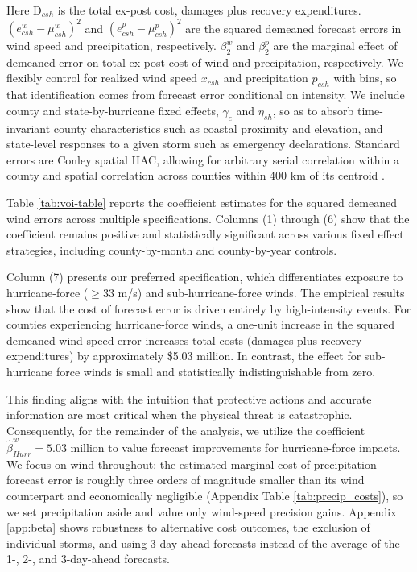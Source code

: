 \documentclass[12pt]{article}%
\begin{document}
Here $\text{D}_{csh}$ is the total ex-post cost, damages plus recovery expenditures. $\left(e^w_{csh}-\mu^w_{csh}\right)^2$ and $\left(e^p_{csh}-\mu^p_{csh}\right)^2$ are the squared demeaned forecast errors in wind speed and precipitation, respectively. $\beta^{w}_{2}$ and $\beta^{p}_{2}$ are the marginal effect of demeaned error on total ex-post cost of wind and precipitation, respectively. We flexibly control for realized wind speed $x_{csh}$ and precipitation $p_{csh}$ with bins, so that identification comes from forecast error conditional on intensity. We include county and state-by-hurricane fixed effects, $\gamma_{c}$ and $\eta_{sh}$, so as to absorb time-invariant county characteristics such as coastal proximity and elevation, and state-level responses to a given storm such as emergency declarations. Standard errors are Conley spatial HAC, allowing for arbitrary serial correlation within a county and spatial correlation across counties within 400 km of its centroid \citep{Conley1999}.

Table \ref{tab:voi-table} reports the coefficient estimates for the squared demeaned wind errors across multiple specifications. Columns (1) through (6) show that the coefficient remains positive and statistically significant across various fixed effect strategies, including county-by-month and county-by-year controls.



Column (7) presents our preferred specification, which differentiates exposure to hurricane-force ($\geq33$ m/s) and sub-hurricane-force winds. The empirical results show that the cost of forecast error is driven entirely by high-intensity events. For counties experiencing hurricane-force winds, a one-unit increase in the squared demeaned wind speed error increases total costs (damages plus recovery expenditures) by approximately \$5.03 million. In contrast, the effect for sub-hurricane force winds is small and statistically indistinguishable from zero.

This finding aligns with the intuition that protective actions and accurate information are most critical when the physical threat is catastrophic. Consequently, for the remainder of the analysis, we utilize the coefficient $\hat{\beta}^w_{Hurr} = 5.03$ million to value forecast improvements for hurricane-force impacts. We focus on wind throughout: the estimated marginal cost of precipitation forecast error is roughly three orders of magnitude smaller than its wind counterpart and economically negligible (Appendix Table \ref{tab:precip_costs}), so we set precipitation aside and value only wind-speed precision gains. Appendix \ref{app:beta} shows robustness to alternative cost outcomes, the exclusion of individual storms, and using 3-day-ahead forecasts instead of the average of the 1-, 2-, and 3-day-ahead forecasts.
\end{document}
